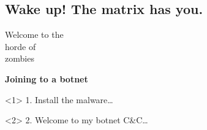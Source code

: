 \subsection{Wake up! The matrix has you.}

{
\begin{frame}[plain]
    \Huge\bfseries
    \vspace{2cm}
    \color{white}
    \begin{minipage}{.7\textwidth}
      Welcome to the\\ horde of\\ zombies
    \end{minipage}
\end{frame}
}

{
\begin{frame}[plain]
  \begin{center}
    \LARGE\bfseries
    Joining to a botnet
  \end{center}

  \vspace{.5cm}

  \begin{onlyenv}<1>
    1. Install the malware\ldots
    \begin{center}
    \end{center}
  \end{onlyenv}

  \begin{onlyenv}<2>
    2. Welcome to my botnet C\&C\ldots
    \begin{center}
    \end{center}
  \end{onlyenv}

\end{frame}
}
